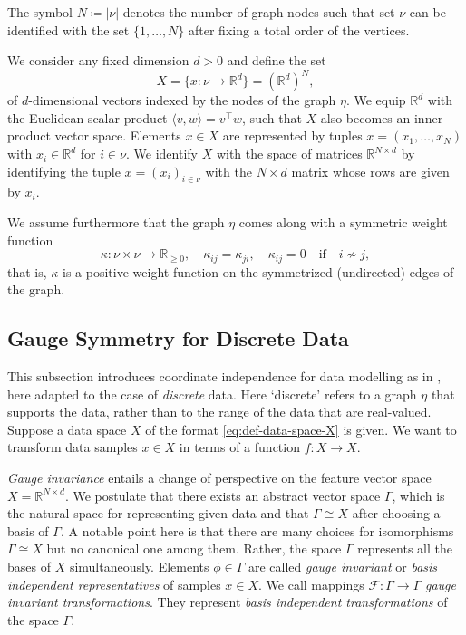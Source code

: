 \documentclass[10pt,reqno]{amsart}
\numberwithin{equation}{section}
\theoremstyle{bfnote}
\theoremstyle{bfdef}
\newcommand{\mc}[1]{\mathcal{#1}}
\newcommand{\la}{\langle}
\newcommand{\ra}{\rangle}
\newcommand{\R}{\mathbb{R}}
\providecommand\x; %
\renewcommand{\x}{x}
\providecommand\X; %
\renewcommand{\X}{X}
\providecommand\XX; %
\renewcommand{\XX}{\Gamma}
\begin{document}
	The symbol $N \coloneqq | \nu |$ denotes the number of graph nodes such that set $\nu$ can be identified with the set $\{1,\dots , N\}$ after fixing a total order of the vertices. 
	
	We consider any fixed dimension $d > 0$ and define the set
	\begin{equation}\label{eq:def-data-space-X}
		\X = \{ \x : \nu \to \R^{d} \} = (\R^{d})^{N},
	\end{equation}
	of $d$-dimensional vectors indexed by the nodes of the graph $\eta$. We equip $\R^{d}$ with the Euclidean scalar product $\la v,w\ra = v^\top w$, such that $\X$ also becomes an inner product vector space.  Elements $\x \in \X$ are represented by tuples $x = (x_1, \ldots, x_N)$ with $\x_i \in \R^d$ for $i \in \nu$. We identify $X$ with the space of matrices $\R^{N\times d}$ by identifying the tuple $x = (x_i)_{i \in \nu}$ with the $N \times d$ matrix whose rows are given by $\x_i$. 

	We assume furthermore that the graph $\eta$ comes along with a symmetric weight function
	\begin{equation}
		\kappa : \nu \times \nu \to \R_{\geq 0}, \quad \kappa_{ij} = \kappa_{ji}, \quad \kappa_{ij} = 0 \quad \text{if} \quad i \not\sim j,
	\end{equation}
	that is, $\kappa$ is a positive weight function on the symmetrized (undirected) edges of the graph.

\subsection{Gauge Symmetry for Discrete Data}
	This subsection introduces coordinate independence for data modelling as in \cite{weilerCoordinateIndependentConvolutional2021,gerkenGeometricDeepLearning2021}, here adapted to the case of \textit{discrete} data. Here `discrete' refers to a graph $\eta$ that supports the data, rather than to the range of the data that are real-valued. Suppose a data space $X$ of the format \eqref{eq:def-data-space-X} is given. We want to transform data samples $\x \in \X$ in terms of a function $f : \X \to \X$.

	\textit{Gauge invariance} entails a change of perspective on the feature vector space $X=\R^{N \times d}$. We postulate that there exists an abstract vector space $\XX$, which is the natural space for representing given data and that $\XX \cong \X$ after choosing a basis of $\XX$.
	A notable point here is that there are many choices for isomorphisms $\XX \cong \X$ but no canonical one among them. Rather, the space $\XX$ represents all the bases of $\X$ simultaneously.
	Elements $\phi \in \XX$ are called \textit{gauge invariant} or \textit{basis independent representatives} of samples $\x \in \X$. We call mappings $\mc{F} : \XX \to \XX$ \textit{gauge invariant transformations}. They represent \textit{basis independent transformations} of the space $\XX$.
\end{document}
